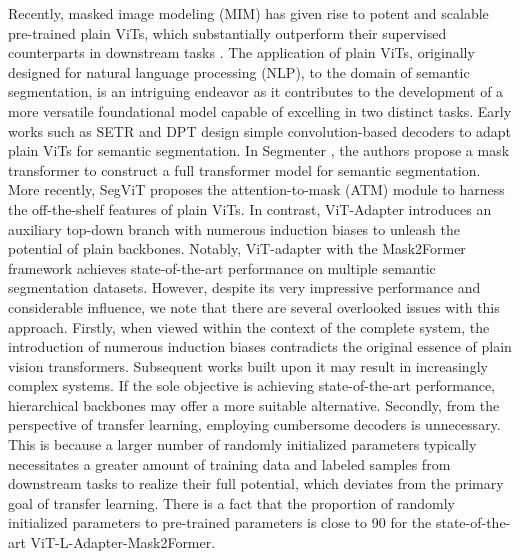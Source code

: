 \documentclass{article} \usepackage{iclr2024_conference,times}
\begin{document}
Recently, masked image modeling (MIM) has given rise to potent and scalable pre-trained plain ViTs, which substantially outperform their supervised counterparts in downstream tasks \citep{he2022masked,bao2022beit,zhou2022image,peng2022beit}. The application of plain ViTs, originally designed for natural language processing (NLP), to the domain of semantic segmentation, is an intriguing endeavor as it contributes to the development of a more versatile foundational model capable of excelling in two distinct tasks. Early works such as SETR \citep{zheng2021rethinking} and DPT \citep{ranftl2021vision} design simple convolution-based decoders to adapt plain ViTs for semantic segmentation. In Segmenter \citep{strudel2021segmenter}, the authors propose a mask transformer to construct a full transformer model for semantic segmentation. More recently, SegViT \citep{zhang2022segvit} proposes the attention-to-mask (ATM) module to harness the off-the-shelf features of plain ViTs. In contrast, ViT-Adapter \citep{chen2023vision} introduces an auxiliary top-down branch with numerous induction biases to unleash the potential of plain backbones. Notably, ViT-adapter with the Mask2Former \citep{cheng2022masked} framework achieves state-of-the-art performance on multiple semantic segmentation datasets. However, despite its very impressive performance and considerable influence, we note that there are several overlooked issues with this approach. Firstly, when viewed within the context of the complete system, the introduction of numerous induction biases contradicts the original essence of plain vision transformers. Subsequent works built upon it may result in increasingly complex systems. If the sole objective is achieving state-of-the-art performance, hierarchical backbones \citep{wang2022internimage} may offer a more suitable alternative. Secondly, from the perspective of transfer learning, employing cumbersome decoders is unnecessary. This is because a larger number of randomly initialized parameters typically necessitates a greater amount of training data and labeled samples from downstream tasks to realize their full potential, which deviates from the primary goal of transfer learning. There is a fact that the proportion of randomly initialized parameters to pre-trained parameters is close to 90  for the state-of-the-art ViT-L-Adapter-Mask2Former.
\end{document}

